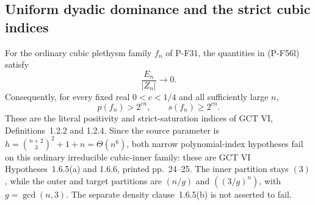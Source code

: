 \subsection{Uniform dyadic dominance and the strict cubic indices}

\begin{theorem}
\label{thm:dyadicdominance}
For the ordinary cubic plethysm family $f_n$ of P-F31, the
quantities in (P-F56l) satisfy
\[
                         \frac{E_n}{|Z_n|}\longrightarrow0.
 \tag{P-F57a}
\]
Consequently, for every fixed real $0<c<1/4$ and all
sufficiently large $n$,
\[
                  p(f_n)>2^{cn},
             \qquad s(f_n)\ge2^{cn}.
\]
These are the literal positivity and strict-saturation indices
of GCT VI, Definitions~1.2.2 and 1.2.4.
Since the source parameter is
$h=\binom{n+2}{3}^{\!2}+1+n=\Theta(n^6)$, both narrow
polynomial-index hypotheses fail on this ordinary irreducible
cubic-inner family: these are GCT VI Hypotheses~1.6.5(a) and
1.6.6, printed pp.~24--25. The inner partition stays $(3)$,
while the outer and target partitions are $(n/g)$ and
$((3/g)^n)$, with $g=\gcd(n,3)$. The separate density
clause~1.6.5(b) is not asserted to fail.
\end{theorem}


